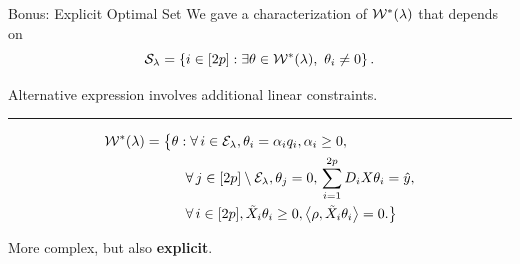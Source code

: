\documentclass[usenames,dvipsnames,mathserif,notheorems]{beamer}
\newcommand{\horizontalrule}{
	{
			\vspace{-0.5em}
			\center \rule{\textwidth}{0.1em}
			\vspace{-0.2em}
		}
}
\begin{document}




\begin{frame}{Bonus: Explicit Optimal Set}
	We gave a characterization of \( \mathcal{W}^*(\lambda) \) that depends on
	\[
		\mathcal{S}_\lambda
		= \left\{{i} \in [2p] : \exists \theta \in \mathcal{W}^*(\lambda), \
			\theta_i \neq 0\right\}.
	\]

	Alternative expression involves additional linear constraints.

	\pause
	\horizontalrule

	\begin{equation*}
		\begin{aligned}
			\mathcal{W}^*(\lambda) =
			\big\{ & \theta  :
			\forall \, {i}  \in  {\mathcal{E}_{\lambda}},
			\theta_i =  \alpha_{i} q_i, \alpha_{i} \geq 0, \,           \\
			       & \quad \forall \, j \in [2p] \setminus {\mathcal{E}_{\lambda}},
			\theta_{j} = 0, \, \sum_{i=1}^{2p} D_i X \theta_i = \hat y, \\
			       & \quad \forall \, i \in [2p],
			\tilde X_i \theta_i \geq 0, \left\langle\rho, \tilde X_i \theta_i \right\rangle = 0.
			\big\}
		\end{aligned}
	\end{equation*}

	\pause

	More complex, but also \textbf{explicit}.

\end{frame}
\end{document}
